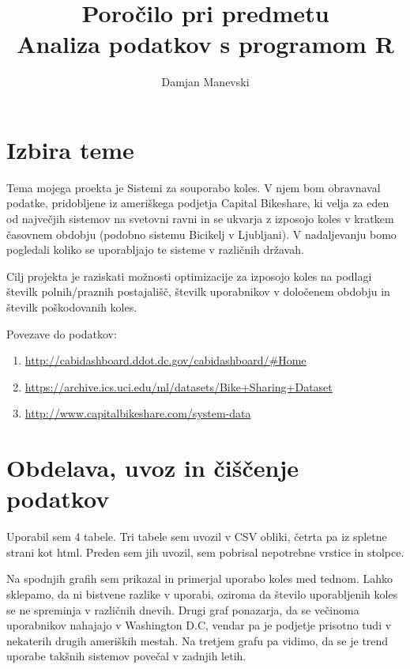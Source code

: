 \documentclass[11pt,a4paper]{article}
\begin{document}
\title{Poročilo pri predmetu \\
Analiza podatkov s programom R}
\author{Damjan Manevski}
\maketitle

\section{Izbira teme}

  Tema mojega proekta je Sistemi za souporabo koles. V njem bom obravnaval podatke, pridobljene iz ameriškega podjetja Capital Bikeshare, ki velja za eden od največjih sistemov na svetovni ravni in se ukvarja z izposojo koles v kratkem časovnem obdobju (podobno sistemu Bicikelj v Ljubljani). V nadaljevanju bomo pogledali koliko se uporabljajo te sisteme v različnih državah. 
  
  Cilj projekta je raziskati možnosti optimizacije za izposojo koles na podlagi številk polnih/praznih postajališč, številk uporabnikov v določenem obdobju in številk poškodovanih koles.
  
  Povezave do podatkov:
  
\begin{enumerate}

\item{\url{http://cabidashboard.ddot.dc.gov/cabidashboard/#Home}}

\item{\url{https://archive.ics.uci.edu/ml/datasets/Bike+Sharing+Dataset}}

\item{\url{http://www.capitalbikeshare.com/system-data}}

\end{enumerate}

\section{Obdelava, uvoz in čiščenje podatkov}

Uporabil sem 4 tabele. Tri tabele sem uvozil v CSV obliki, četrta pa iz spletne strani kot html. Preden sem jih uvozil, sem pobrisal nepotrebne vrstice in stolpce.

Na spodnjih grafih sem prikazal in primerjal uporabo koles med tednom. Lahko sklepamo, da ni bistvene razlike v uporabi, oziroma da število uporabljenih koles se ne spreminja v različnih dnevih. Drugi graf ponazarja, da se večinoma uporabnikov nahajajo v Washington D.C, vendar pa je podjetje prisotno tudi v nekaterih drugih ameriških mestah. Na tretjem grafu pa vidimo, da se je trend uporabe takšnih sistemov povečal v zadnjih letih.
\end{document}
